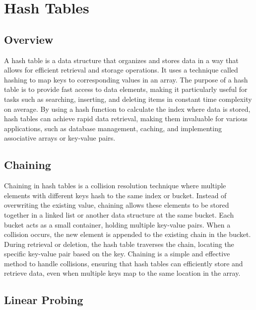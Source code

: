 \clearpage

\section*{Hash Tables}

\subsection*{Overview}

A hash table is a data structure that organizes and stores data in a way that allows for efficient retrieval and storage operations. It uses a technique called hashing to map keys to corresponding values 
in an array. The purpose of a hash table is to provide fast access to data elements, making it particularly useful for tasks such as searching, inserting, and deleting items in constant time complexity 
on average. By using a hash function to calculate the index where data is stored, hash tables can achieve rapid data retrieval, making them invaluable for various applications, such as database management, 
caching, and implementing associative arrays or key-value pairs.

\subsection*{Chaining}

Chaining in hash tables is a collision resolution technique where multiple elements with different keys hash to the same index or bucket. Instead of overwriting the existing value, chaining allows these elements 
to be stored together in a linked list or another data structure at the same bucket. Each bucket acts as a small container, holding multiple key-value pairs. When a collision occurs, the new element is appended 
to the existing chain in the bucket. During retrieval or deletion, the hash table traverses the chain, locating the specific key-value pair based on the key. Chaining is a simple and effective method to handle 
collisions, ensuring that hash tables can efficiently store and retrieve data, even when multiple keys map to the same location in the array.

\subsection*{Linear Probing}

